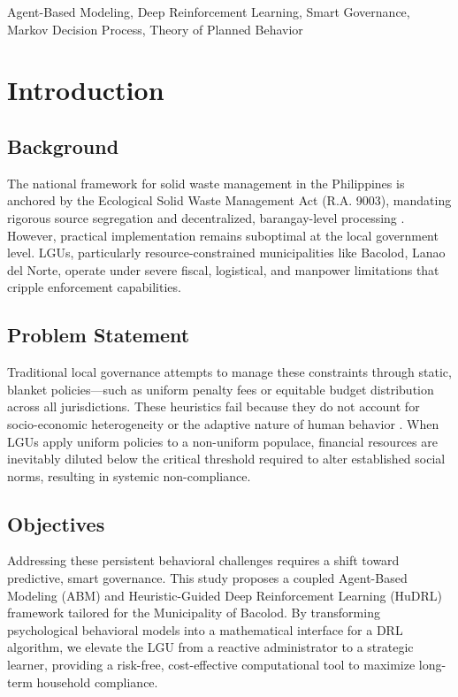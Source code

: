 \documentclass[conference,a4paper]{IEEEtran}
\begin{document}
\begin{IEEEkeywords}
Agent-Based Modeling, Deep Reinforcement Learning, Smart Governance, Markov Decision Process, Theory of Planned Behavior
\end{IEEEkeywords}

\section{Introduction}

\subsection{Background}
The national framework for solid waste management in the Philippines is anchored by the Ecological Solid Waste Management Act (R.A. 9003), mandating rigorous source segregation and decentralized, barangay-level processing \cite{ra9003}. However, practical implementation remains suboptimal at the local government level. LGUs, particularly resource-constrained municipalities like Bacolod, Lanao del Norte, operate under severe fiscal, logistical, and manpower limitations that cripple enforcement capabilities.

\subsection{Problem Statement}
Traditional local governance attempts to manage these constraints through static, blanket policies—such as uniform penalty fees or equitable budget distribution across all jurisdictions. These heuristics fail because they do not account for socio-economic heterogeneity or the adaptive nature of human behavior \cite{tian2024}. When LGUs apply uniform policies to a non-uniform populace, financial resources are inevitably diluted below the critical threshold required to alter established social norms, resulting in systemic non-compliance.

\subsection{Objectives}
Addressing these persistent behavioral challenges requires a shift toward predictive, smart governance. This study proposes a coupled Agent-Based Modeling (ABM) and Heuristic-Guided Deep Reinforcement Learning (HuDRL) framework tailored for the Municipality of Bacolod. By transforming psychological behavioral models into a mathematical interface for a DRL algorithm, we elevate the LGU from a reactive administrator to a strategic learner, providing a risk-free, cost-effective computational tool to maximize long-term household compliance.
\end{document}
